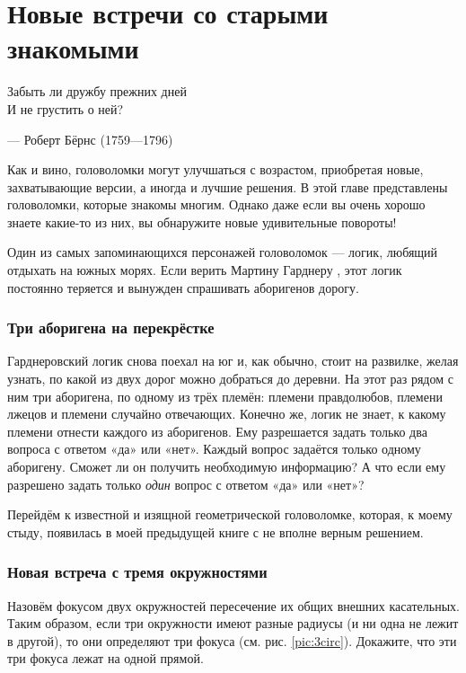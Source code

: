 \chapter{Новые встречи со старыми знакомыми}

\setlength{\epigraphwidth}{.53\textwidth}
\epigraph{Забыть ли дружбу прежних дней\\
И не грустить о ней?}{--- Роберт Бёрнс (1759---1796)}

Как и вино, головоломки могут улучшаться с возрастом, приобретая новые, захватывающие версии, а иногда и лучшие решения.
В этой главе представлены головоломки, которые знакомы многим.
Однако даже если вы очень хорошо знаете какие-то из них, 
вы обнаружите новые удивительные повороты!

Один из самых запоминающихся персонажей головоломок --- логик, любящий отдыхать на южных морях.
Если верить Мартину Гарднеру \cite{27}, этот логик постоянно теряется и вынужден спрашивать аборигенов дорогу.

\subsection*{Три аборигена на перекрёстке}

Гарднеровский логик снова поехал на юг и, как обычно, стоит на развилке, желая узнать, по какой из двух дорог можно добраться до деревни.
На этот раз рядом с ним три аборигена, по одному из трёх племён:
племени правдолюбов,
племени лжецов
и племени случайно отвечающих.
Конечно же, логик не знает, к какому племени отнести каждого из аборигенов.
Ему разрешается задать только два вопроса с ответом «да» или «нет».
Каждый вопрос задаётся только одному аборигену.
Сможет ли он получить необходимую информацию?
А что если ему разрешено задать только \emph{один} вопрос с ответом «да» или «нет»?

\medskip

Перейдём к известной и изящной геометрической головоломке, которая, к моему стыду, появилась в моей предыдущей книге \cite{59} с не вполне верным решением.

\subsection*{Новая встреча с тремя окружностями}

Назовём фокусом двух окружностей пересечение их общих внешних касательных.
Таким образом, если три окружности имеют разные радиусы (и ни одна не лежит в другой), то они определяют три фокуса (см. рис. \ref{pic:3circ}).
Докажите, что эти три фокуса лежат на одной прямой.

